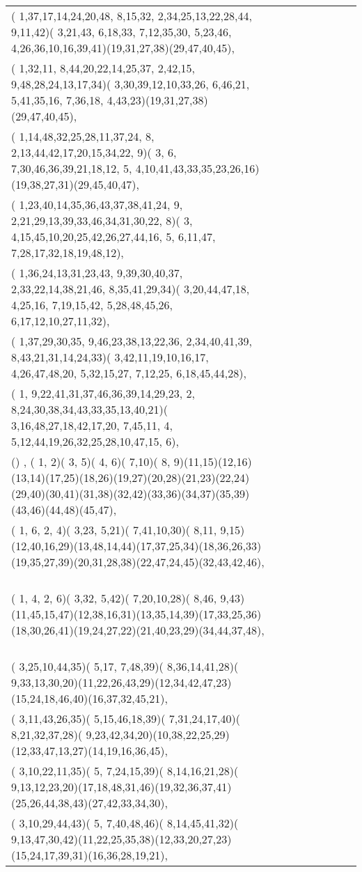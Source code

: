\documentclass[border=10]{standalone}
\begin{document}
\begin{tabular}{@{}l@{}l@{}l@{}l@{}l@{}l@{}l@{}l@{}}
( 1,37,17,14,24,20,48, 8,15,32, 2,34,25,13,22,28,44, 9,11,42)( 3,21,43, 6,18,33, 7,12,35,30, 5,23,46, 4,26,36,10,16,39,41)(19,31,27,38)(29,47,40,45), \ \\
( 1,32,11, 8,44,20,22,14,25,37, 2,42,15, 9,48,28,24,13,17,34)( 3,30,39,12,10,33,26, 6,46,21, 5,41,35,16, 7,36,18, 4,43,23)(19,31,27,38)(29,47,40,45), \ \\
( 1,14,48,32,25,28,11,37,24, 8, 2,13,44,42,17,20,15,34,22, 9)( 3, 6, 7,30,46,36,39,21,18,12, 5, 4,10,41,43,33,35,23,26,16)(19,38,27,31)(29,45,40,47), \ \\
( 1,23,40,14,35,36,43,37,38,41,24, 9, 2,21,29,13,39,33,46,34,31,30,22, 8)( 3, 4,15,45,10,20,25,42,26,27,44,16, 5, 6,11,47, 7,28,17,32,18,19,48,12), \ \\
( 1,36,24,13,31,23,43, 9,39,30,40,37, 2,33,22,14,38,21,46, 8,35,41,29,34)( 3,20,44,47,18, 4,25,16, 7,19,15,42, 5,28,48,45,26, 6,17,12,10,27,11,32), \ \\
( 1,37,29,30,35, 9,46,23,38,13,22,36, 2,34,40,41,39, 8,43,21,31,14,24,33)( 3,42,11,19,10,16,17, 4,26,47,48,20, 5,32,15,27, 7,12,25, 6,18,45,44,28), \ \\
( 1, 9,22,41,31,37,46,36,39,14,29,23, 2, 8,24,30,38,34,43,33,35,13,40,21)( 3,16,48,27,18,42,17,20, 7,45,11, 4, 5,12,44,19,26,32,25,28,10,47,15, 6), \ \\
() , ( 1, 2)( 3, 5)( 4, 6)( 7,10)( 8, 9)(11,15)(12,16)(13,14)(17,25)(18,26)(19,27)(20,28)(21,23)(22,24)(29,40)(30,41)(31,38)(32,42)(33,36)(34,37)(35,39)(43,46)(44,48)(45,47),\ \\ 
( 1, 6, 2, 4)( 3,23, 5,21)( 7,41,10,30)( 8,11, 9,15)(12,40,16,29)(13,48,14,44)(17,37,25,34)(18,36,26,33)(19,35,27,39)(20,31,28,38)(22,47,24,45)(32,43,42,46), \ \\
( 1, 4, 2, 6)( 3,32, 5,42)( 7,20,10,28)( 8,46, 9,43)(11,45,15,47)(12,38,16,31)(13,35,14,39)(17,33,25,36)(18,30,26,41)(19,24,27,22)(21,40,23,29)(34,44,37,48), \ \\
( 3,25,10,44,35)( 5,17, 7,48,39)( 8,36,14,41,28)( 9,33,13,30,20)(11,22,26,43,29)(12,34,42,47,23)(15,24,18,46,40)(16,37,32,45,21),\ \\
( 3,11,43,26,35)( 5,15,46,18,39)( 7,31,24,17,40)( 8,21,32,37,28)( 9,23,42,34,20)(10,38,22,25,29)(12,33,47,13,27)(14,19,16,36,45), \ \\
( 3,10,22,11,35)( 5, 7,24,15,39)( 8,14,16,21,28)( 9,13,12,23,20)(17,18,48,31,46)(19,32,36,37,41)(25,26,44,38,43)(27,42,33,34,30), \ \\
( 3,10,29,44,43)( 5, 7,40,48,46)( 8,14,45,41,32)( 9,13,47,30,42)(11,22,25,35,38)(12,33,20,27,23)(15,24,17,39,31)(16,36,28,19,21), \ \\

\end{tabular}
\end{document}
